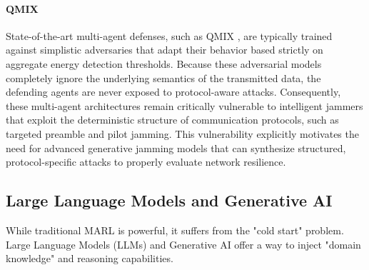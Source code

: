 \documentclass[conference]{IEEEtran}
\newcommand{\adm}[1]{{\color{orange}{[#1]}}}
\newcommand{\rar}[1]{{\color{blue}{[#1]}}}
\begin{document}
\paragraph{QMIX}
State-of-the-art multi-agent defenses, such as QMIX \cite{abolhassani2025coordinated}, are typically trained against simplistic adversaries that adapt their behavior based strictly on aggregate energy detection thresholds.
Because these adversarial models completely ignore the underlying semantics of the transmitted data, the defending agents are never exposed to protocol-aware attacks.
Consequently, these multi-agent architectures remain critically vulnerable to intelligent jammers that exploit the deterministic structure of communication protocols, such as targeted preamble and pilot jamming.
This vulnerability explicitly motivates the need for advanced generative jamming models that can synthesize structured, protocol-specific attacks to properly evaluate network resilience.




\subsection{Large Language Models and Generative AI}

While traditional MARL is powerful, it suffers from the "cold start" problem.
Large Language Models (LLMs) and Generative AI offer a way to inject "domain knowledge" and reasoning capabilities.
\adm{hypothesis to be verified. when does the higher compute of an LLM outperform smaller, more efficient narrow-task models?}
\rar{research?}
\end{document}

